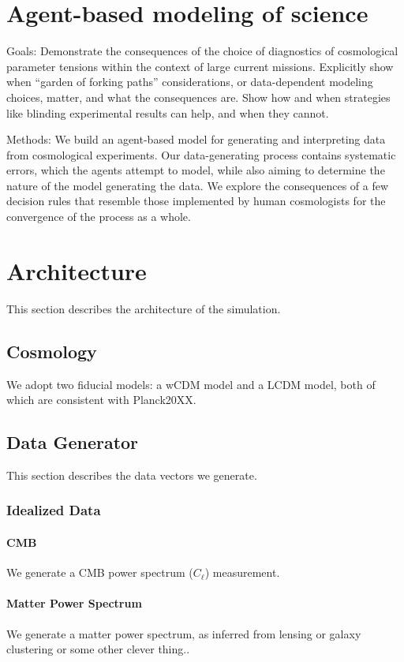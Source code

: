 \documentclass{article}
\begin{document}
\section{Agent-based modeling of science}
Goals: Demonstrate the consequences of the choice of diagnostics of cosmological parameter tensions within the context of large current missions. Explicitly show when ``garden of forking paths'' considerations, or data-dependent modeling choices, matter, and what the consequences are. Show how and when strategies like blinding experimental results can help, and when they cannot.

Methods: We build an agent-based model for generating and interpreting data from cosmological experiments. Our data-generating process contains systematic errors, which the agents attempt to model, while also aiming to determine the nature of the model generating the data. We explore the consequences of a few decision rules that resemble those implemented by human cosmologists for the convergence of the process as a whole.


\section{Architecture}
This section describes the architecture of the simulation.

\subsection{Cosmology}
We adopt two fiducial models: a wCDM model and a LCDM model, both of which are consistent with Planck20XX.

\subsection{Data Generator}
This section describes the data vectors we generate.


\subsubsection{Idealized Data}

\paragraph{CMB}
We generate a CMB power spectrum ($C_\ell$) measurement.

\paragraph{Matter Power Spectrum}
We generate a matter power spectrum, as inferred from lensing or galaxy clustering or some other clever thing..
\end{document}

